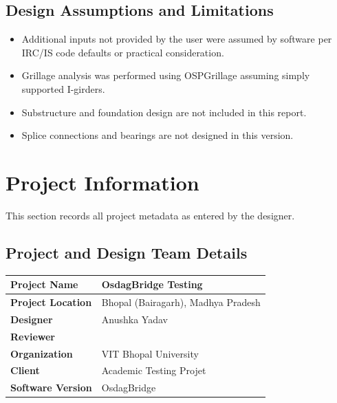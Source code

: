 \documentclass[12pt,a4paper]{report}
\numberwithin{table}{chapter}
\numberwithin{figure}{chapter}
\begin{document}
\section*{Design Assumptions and Limitations}
\label{sec:assumptions}

\begin{itemize}
\item Additional inputs not provided by the user were assumed by software per IRC/IS code defaults or practical consideration.
\item Grillage analysis was performed using OSPGrillage assuming simply supported I-girders.
\item Substructure and foundation design are not included in this report.
\item Splice connections and bearings are not designed in this version.
\end{itemize}

\titleformat{\chapter}[block]{\normalfont\Large\bfseries\centering}{\thechapter}{1em}{}
\titlespacing*{\chapter}{0pt}{-30pt}{10pt}


\chapter{Project Information}

This section records all project metadata as entered by the designer.

\section{Project and Design Team Details}
\label{sec:project-details}

\begin{tabular}{|L{5.5cm}|L{8.5cm}|}
\hline
\textbf{Project Name} & OsdagBridge Testing \\
\hline
\textbf{Project Location} & Bhopal (Bairagarh), Madhya Pradesh \\
\hline
\textbf{Designer} & Anushka Yadav \\
\hline
\textbf{Reviewer} &  \\
\hline
\textbf{Organization} & VIT Bhopal University \\
\hline
\textbf{Client} & Academic Testing Projet \\
\hline
\textbf{Software Version} & OsdagBridge \\
\hline
\end{tabular}
\end{document}
